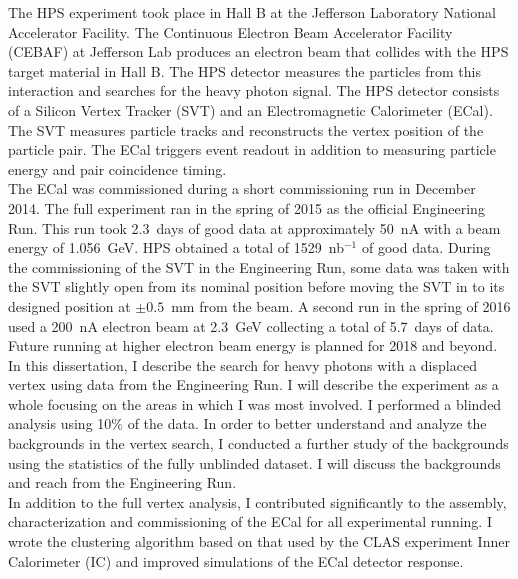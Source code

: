 The HPS experiment took place in Hall B at the Jefferson Laboratory National Accelerator Facility. The Continuous Electron Beam Accelerator Facility (CEBAF) at Jefferson Lab produces an electron beam that collides with the HPS target material in Hall B. The HPS detector measures the particles from this interaction and searches for the heavy photon signal. The HPS detector consists of a Silicon Vertex Tracker (SVT) and an Electromagnetic Calorimeter (ECal). The SVT measures particle tracks and reconstructs the vertex position of the particle pair. The ECal triggers event readout in addition to measuring particle energy and pair coincidence timing. \\
\indent The ECal was commissioned during a short commissioning run in December 2014. The full experiment ran in the spring of 2015 as the official Engineering Run. This run took 2.3~days of good data at approximately 50~nA with a beam energy of 1.056~GeV. HPS obtained a total of 1529~nb$^{-1}$ of good data. During the commissioning of the SVT in the Engineering Run, some data was taken with the SVT slightly open from its nominal position before moving the SVT in to its designed position at $\pm0.5$~mm from the beam. A second run in the spring of 2016 used a 200~nA electron beam at 2.3~GeV collecting a total of 5.7~days of data.  Future running at higher electron beam energy is planned for 2018 and beyond.\\
\indent In this dissertation, I describe the search for heavy photons with a displaced vertex using data from the Engineering Run. I will describe the experiment as a whole focusing on the areas in which I was most involved. I performed a blinded analysis using 10$\%$ of the data. In order to better understand and analyze the backgrounds in the vertex search, I conducted a further study of the backgrounds using the statistics of the fully unblinded dataset. I will discuss the backgrounds and reach from the Engineering Run.\\
\indent In addition to the full vertex analysis, I contributed significantly to the assembly, characterization and commissioning of the ECal for all experimental running. I wrote the clustering algorithm based on that used by the CLAS experiment Inner Calorimeter (IC) and improved simulations of the ECal detector response.
